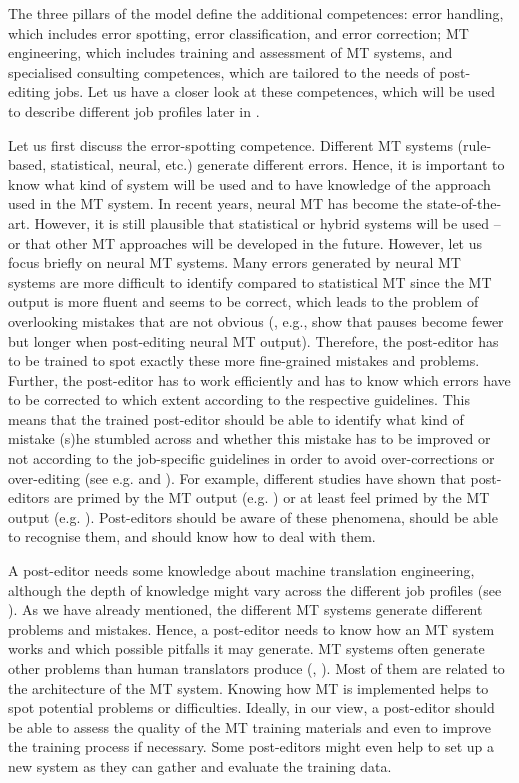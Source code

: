 \bigskip

The three pillars of the model define the additional competences: error handling, which includes error spotting, error classification, and error correction; MT engineering, which includes training and assessment of MT systems, and specialised consulting competences, which are tailored to the needs of post-editing jobs. Let us have a closer look at these competences, which will be used to describe different job profiles later in .

Let us first discuss the error-spotting competence. Different MT systems (rule-based, statistical, neural, etc.) generate different errors. Hence, it is important to know what kind of system will be used and to have knowledge of the approach used in the MT system. In recent years, neural MT has become the state-of-the-art. However, it is still plausible that statistical or hybrid systems will be used -- or that other MT approaches will be developed in the future. However, let us focus briefly on neural MT systems. Many errors generated by neural MT systems are more difficult to identify compared to statistical MT since the MT output is more fluent and seems to be correct, which leads to the problem of overlooking mistakes that are not obvious (\citealt{toral2018post}, e.g., show that pauses become fewer but longer when post-editing neural MT output). Therefore, the post-editor has to be trained to spot exactly these more fine-grained mistakes and problems. Further, the post-editor has to work efficiently and has to know which errors have to be corrected to which extent according to the respective guidelines. This means that the trained post-editor should be able to identify what kind of mistake (s)he stumbled across and whether this mistake has to be improved or not according to the job-specific guidelines in order to avoid over-corrections or over-editing (see e.g. \citealt{nitzke2020preferential} and \citealt{vardaro2019translation}). For example, different studies have shown that post-editors are primed by the MT output (e.g. \citealt{bangalore2015role}) or at least feel primed by the MT output (e.g. \citealt{moorkens2018translators}). Post-editors should be aware of these phenomena, should be able to recognise them, and should know how to deal with them. 

A post-editor needs some knowledge about machine translation engineering, although the depth of knowledge might vary across the different job profiles (see ). As we have already mentioned, the different MT systems generate different problems and mistakes. Hence, a post-editor needs to know how an MT system works and which possible pitfalls it may generate. MT systems often generate other problems than human translators produce (\citealt{carl_post-editing_2015}, \citealt{nitzke2019problem}). Most of them are related to the architecture of the MT system. Knowing how MT is implemented helps to spot potential problems or difficulties. Ideally, in our view, a post-editor should be able to assess the quality of the MT training materials and even to improve the training process if necessary. Some post-editors might even help to set up a new system as they can gather and evaluate the training data.

